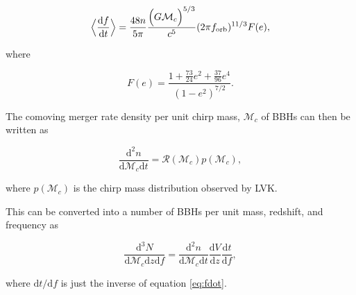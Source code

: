 \documentclass[twocolumn]{aastex631}
\begin{document}
\begin{equation}
    \Big\langle\frac{\mathrm{d}f}{\mathrm{d}t}\Big\rangle = \frac{48 n}{5 \pi} \frac{\Big(G \mathcal{M}_c \Big)^{5/3}}{c^5} (2 \pi f_{\rm orb})^{11/3} F(e), 
    \label{eq:fdot}
\end{equation}

\noindent where 

\begin{equation}
    F(e) = \frac{1 + \frac{73}{24} e^2 + \frac{37}{96} e^4}{(1 - e^2)^{7/2}}.
    \label{eq:eccentricity_enhancement_factor}
\end{equation}

The comoving merger rate density per unit chirp mass, $\mathcal{M}_c$ of BBHs can then be written as

\begin{equation}
    \frac{\mathrm{d}^2n}{\mathrm{d}\mathcal{M}_c \mathrm{d}t} = \mathcal{R}(\mathcal{M}_c) p(\mathcal{M}_c),
    \label{eq:merger_rate_density}
\end{equation}

\noindent where $p(\mathcal{M}_c)$ is the chirp mass distribution observed by LVK. 

This can be converted into a number of BBHs per unit mass, redshift, and frequency as

\begin{equation}
    \frac{\mathrm{d}^3N}{\mathrm{d}\mathcal{M}_c \mathrm{d}z \mathrm{d}f} = \frac{\mathrm{d}^2n}{\mathrm{d}\mathcal{M}_c \mathrm{d}t} \frac{\mathrm{d}V}{\mathrm{d}z} \frac{\mathrm{d}t}{\mathrm{d}f},
    \label{eq:rate_per_freq}
\end{equation}

where $\mathrm{d}t / \mathrm{d}f$ is just the inverse of equation \ref{eq:fdot}.





\end{document}
